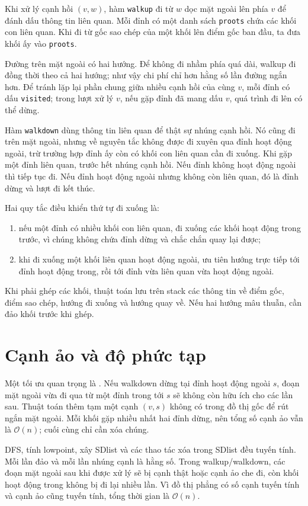\documentclass[11pt]{article}
\newcommand{\Oh}{\mathcal{O}}
\begin{document}
Khi xử lý cạnh hồi \((v,w)\), hàm \texttt{walkup} đi từ \(w\) dọc mặt ngoài
lên phía \(v\) để đánh dấu thông tin liên quan. Mỗi đỉnh có một danh sách
\texttt{proots} chứa các khối con liên quan. Khi đi từ gốc sao chép của một
khối lên điểm gốc ban đầu, ta đưa khối ấy vào \texttt{proots}.

Đường trên mặt ngoài có hai hướng. Để không đi nhầm phía quá dài, walkup đi
đồng thời theo cả hai hướng; như vậy chi phí chỉ hơn hằng số lần đường ngắn
hơn. Để tránh lặp lại phần chung giữa nhiều cạnh hồi của cùng \(v\), mỗi đỉnh
có dấu \texttt{visited}; trong lượt xử lý \(v\), nếu gặp đỉnh đã mang dấu
\(v\), quá trình đi lên có thể dừng.

Hàm \texttt{walkdown} dùng thông tin liên quan để thật sự nhúng cạnh hồi. Nó
cũng đi trên mặt ngoài, nhưng về nguyên tắc không được đi xuyên qua đỉnh hoạt
động ngoài, trừ trường hợp đỉnh ấy còn có khối con liên quan cần đi xuống.
Khi gặp một đỉnh liên quan, trước hết nhúng cạnh hồi. Nếu đỉnh không hoạt
động ngoài thì tiếp tục đi. Nếu đỉnh hoạt động ngoài nhưng không còn liên
quan, đó là đỉnh dừng và lượt đi kết thúc.

Hai quy tắc điều khiển thứ tự đi xuống là:
\begin{enumerate}
  \item nếu một đỉnh có nhiều khối con liên quan, đi xuống các khối hoạt động
  trong trước, vì chúng không chứa đỉnh dừng và chắc chắn quay lại được;
  \item khi đi xuống một khối liên quan hoạt động ngoài, ưu tiên hướng trực
  tiếp tới đỉnh hoạt động trong, rồi tới đỉnh vừa liên quan vừa hoạt động
  ngoài.
\end{enumerate}
Khi phải ghép các khối, thuật toán lưu trên stack các thông tin về điểm gốc,
điểm sao chép, hướng đi xuống và hướng quay về. Nếu hai hướng mâu thuẫn, cần
đảo khối trước khi ghép.

\section{Cạnh ảo và độ phức tạp}

Một tối ưu quan trọng là . Nếu walkdown dừng tại đỉnh hoạt động
ngoài \(s\), đoạn mặt ngoài vừa đi qua từ một đỉnh trong tới \(s\) sẽ không
còn hữu ích cho các lần sau. Thuật toán thêm tạm một cạnh \((v,s)\) không có
trong đồ thị gốc để rút ngắn mặt ngoài. Mỗi khối gặp nhiều nhất hai đỉnh dừng,
nên tổng số cạnh ảo vẫn là \(\Oh(n)\); cuối cùng chỉ cần xóa chúng.

DFS, tính lowpoint, xây SDlist và các thao tác xóa trong SDlist đều tuyến
tính. Mỗi lần đảo và mỗi lần nhúng cạnh là hằng số. Trong walkup/walkdown,
các đoạn mặt ngoài sau khi được xử lý sẽ bị cạnh thật hoặc cạnh ảo che đi,
còn khối hoạt động trong không bị đi lại nhiều lần. Vì đồ thị phẳng có số
cạnh tuyến tính và cạnh ảo cũng tuyến tính, tổng thời gian là \(\Oh(n)\).
\end{document}
